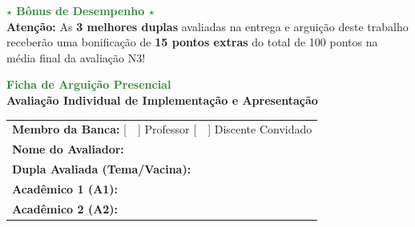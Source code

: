 \documentclass[12pt,a4paper]{article}
\begin{document}
\vspace{0.4cm}
\begin{center}
    \textcolor{forestgreen}{\textbf{\Large $\star$ Bônus de Desempenho $\star$}} \\[0.2cm]
    \textbf{Atenção:} As \textbf{3 melhores duplas} avaliadas na entrega e arguição deste trabalho receberão uma bonificação de \textbf{15 pontos extras } do total de 100 pontos na média final da avaliação N3!
\end{center}
\newpage
\thispagestyle{empty}

\begin{center}
    {\huge \textbf{\textcolor{forestgreen}{Ficha de Arguição Presencial}}} \\[0.3cm]
    {\large \textbf{Avaliação Individual de Implementação e Apresentação}} \\[0.8cm]
\end{center}

\begin{tcolorbox}[colback=white, colframe=forestgreen, title=\textbf{Identificação da Avaliação}, fonttitle=\bfseries]
    \renewcommand{\arraystretch}{1.5}
    \begin{tabular}{p{}}
         \textbf{Membro da Banca:} [~~] Professor \hspace{1cm} [~~] Discente Convidado \\
         \textbf{Nome do Avaliador:} \underline{\hspace{10cm}} \\
         \textbf{Dupla Avaliada (Tema/Vacina):} \underline{\hspace{8.5cm}} \\
         \textbf{Acadêmico 1 (A1):} \underline{\hspace{12cm}} \\
         \textbf{Acadêmico 2 (A2):} \underline{\hspace{12cm}} \\
    \end{tabular}
\end{tcolorbox}

\vspace{0.8cm}
\end{document}
